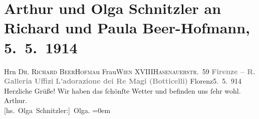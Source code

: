 

         
         \renewcommand{\erwaehntePersonen}{Personen: Richard Beer-Hofmann, Paula Beer-Hofmann, Sandro Botticelli}
         \renewcommand{\erwaehnteOrte}{Orte: Florenz, Hasenauerstraße, Santa Maria Novella, Uffizien, Wien, XVIII., Währing}
         \renewcommand{\erwaehnteWerke}{Werke: Die Anbetung der heiligen drei Könige}
               \section[Arthur und Olga Schnitzler an Richard und Paula Beer-Hofmann, 5. 5. 1914]{ Arthur und Olga Schnitzler an Richard und Paula Beer-Hofmann,
                    5. 5. 1914}\nopagebreak{}\rehead{ }\begin{ledgroupsized}[t]{13cm}\normalsize\beginnumbering \toendnotes[C]{\smallbreak\pagebreak[2]} 
\pstart{}{\pb}Hrn \textsc{Dr. Richard
                                BeerHofma{\geminationn}}\pend{}\pstart{}u Frau\pend{}\pstart{}\textsc{Wien XVIII}\pend{}\pstart{}\textsc{Hasenauerstr. 59}\pend{}{\bigskip}\pstart
           \noindent{}\centering{}{\pb}\textcolor{gray}{\textbf{Firenze – R. Galleria Uffizi}}\pend
           \pstart
           \noindent{}\centering{}\textcolor{gray}{\textbf{L’adorazione dei Re Magi (Botticelli)}}\pend
           \pstart
           \centering{}{\pb}Florenz5. 5. 914\pend
           \pstart
           Herzliche Grüße!\pend
           \pstart
           Wir haben das ſchönſte Wetter und befinden uns ſehr wohl.\pend
           \pstart
           \spacefill\mbox{Arthur.}{\\[\baselineskip]}\spacefill\mbox{{[}hs. Olga Schnitzler:{]} Olga.}\pend
           \leftskip=0em{}
         
         \endnumbering{}\end{ledgroupsized}  \newcommand{\dateiname}{L02177}\newcommand{\titel}{Arthur und Olga Schnitzler an Richard und Paula Beer-Hofmann, 5. 5. 1914}\newcommand{\editorInnen}{Martin Anton Müller und Gerd-Hermann Susen}
      